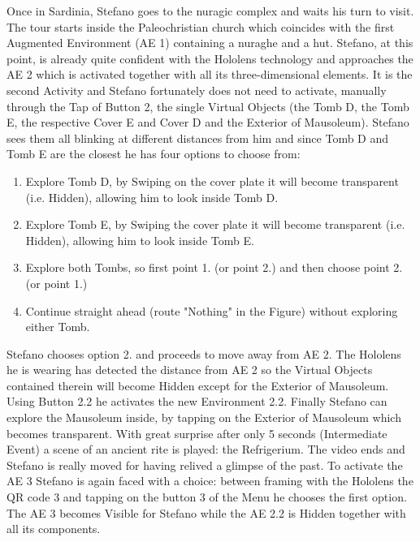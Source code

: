 Once in Sardinia, Stefano goes to the nuragic complex and waits his turn to visit. 
The tour starts inside the Paleochristian church which coincides with the first Augmented Environment (AE 1) containing a nuraghe and a hut. 
Stefano, at this point, is already quite confident with the Hololens technology and approaches the AE 2 which is activated together with all its three-dimensional elements. It is the second Activity and Stefano fortunately does not need to activate, manually through the Tap of Button 2, the single Virtual Objects (the Tomb D, the Tomb E, the respective Cover E and Cover D and the Exterior of Mausoleum). Stefano sees them all blinking at different distances from him and since Tomb D and Tomb E are the closest he has four options to choose from: 
\begin{enumerate}
    \item Explore Tomb D, by Swiping on the cover plate it will become transparent (i.e. Hidden), allowing him to look inside Tomb D.
    \item Explore Tomb E, by Swiping the cover plate it will become transparent (i.e. Hidden), allowing him to look inside Tomb E.
    \item Explore both Tombs, so first point 1. (or point 2.) and then choose point 2. (or point 1.) 
    \item Continue straight ahead (route "Nothing" in the Figure) without exploring either Tomb. 
\end{enumerate}
Stefano chooses option 2. and proceeds to move away from AE 2. The Hololens he is wearing has detected the distance from AE 2 so the Virtual Objects contained therein will become Hidden except for the Exterior of Mausoleum. Using Button 2.2 he activates the new Environment 2.2. 
Finally Stefano can explore the Mausoleum inside, by tapping on the Exterior of Mausoleum which becomes transparent. 
With great surprise after only 5 seconds (Intermediate Event) a scene of an ancient rite is played: the Refrigerium. The video ends and Stefano is really moved for having relived a glimpse of the past. 
To activate the AE 3 Stefano is again faced with a choice: between framing with the Hololens the QR code 3 and tapping on the button 3 of the Menu he chooses the first option. The AE 3 becomes Visible for Stefano while the AE 2.2 is Hidden together with all its components. 
